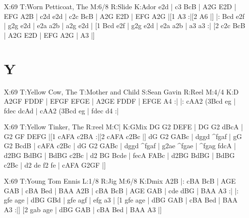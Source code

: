 \documentclass[letterpaper]{article}
\begin{document}
\begin{abc}[name]
X:69
T:Worn Petticoat, The
M:6/8
R:Slide
K:Ador
e2d | c3 BcB | A2G E2D | EFG A2B | c2d e2d |
c2c BcB | A2G E2D | EFG A2G |[1 A3 :|[2 A6 |]
|: Bcd e2f | g2g e2d | e2a a2b | a2g e2d |
[1 Bcd e2f | g2g e2d | e2a a2b | a3 a3 :|
[2 c2c BcB | A2G E2D | EFG A2G | A3 |]
\end{abc}

\section{Y}
\begin{abc}[name]
X:69
T:Yellow Cow, The
T:Mother and Child
S:Sean Gavin
R:Reel
M:4/4
K:D
A2GF FDDF | EFGF EFGE | A2GE FDDF | EFGE A4 :|
|: cAA2 (3Bcd eg | fdec dcAd | cAA2 (3Bcd eg | fdec d4 :|
\end{abc}

\begin{abc}[name]
X:69
T:Yellow Tinker, The
R:reel
M:C|
K:GMix
DG G2 DEFE | DG G2 dBcA | G2 GF DEFG |[1 cAFA c2BA :|[2 cAFA c2Bc |]
dG G2 GABc | dggd ^fgaf | gG G2 BcdB | cAFA c2Bc |
dG G2 GABc | dggd ^fgaf | g2ae ^fgae | ^fgag fdcA |
d2BG BdBG | BdBG c2Bc | d2 BG Bcde | fecA FABc |
d2BG BdBG | BdBG c2Bc | d2 de f2 fe | cAFA G2GF |]
\end{abc}

\begin{abc}[name]
X:69
T:Young Tom Ennis
L:1/8
R:Jig
M:6/8
K:Dmix
A2B |: cBA BcB | AGE GAB | cBA Bed | BAA A2B |
cBA BcB | AGE GAB | cde dBG | BAA A3 :|
|: gfe age | dBG GBd | gfe agf | efg a3 |
[1 gfe age | dBG GAB | cBA Bed | BAA A3 :|]
[2 gab age | dBG GAB | cBA Bed | BAA A3 |]
\end{abc}
\end{document}
